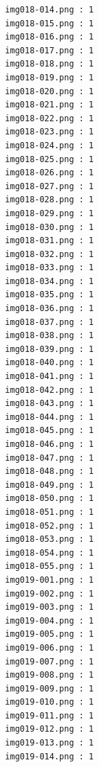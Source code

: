 \documentclass[12pt,a4paper]{article}
\begin{document}
\begin{lstlisting}
                     img018-014.png : 1
                     img018-015.png : 1
                     img018-016.png : 1
                     img018-017.png : 1
                     img018-018.png : 1
                     img018-019.png : 1
                     img018-020.png : 1
                     img018-021.png : 1
                     img018-022.png : 1
                     img018-023.png : 1
                     img018-024.png : 1
                     img018-025.png : 1
                     img018-026.png : 1
                     img018-027.png : 1
                     img018-028.png : 1
                     img018-029.png : 1
                     img018-030.png : 1
                     img018-031.png : 1
                     img018-032.png : 1
                     img018-033.png : 1
                     img018-034.png : 1
                     img018-035.png : 1
                     img018-036.png : 1
                     img018-037.png : 1
                     img018-038.png : 1
                     img018-039.png : 1
                     img018-040.png : 1
                     img018-041.png : 1
                     img018-042.png : 1
                     img018-043.png : 1
                     img018-044.png : 1
                     img018-045.png : 1
                     img018-046.png : 1
                     img018-047.png : 1
                     img018-048.png : 1
                     img018-049.png : 1
                     img018-050.png : 1
                     img018-051.png : 1
                     img018-052.png : 1
                     img018-053.png : 1
                     img018-054.png : 1
                     img018-055.png : 1
                     img019-001.png : 1
                     img019-002.png : 1
                     img019-003.png : 1
                     img019-004.png : 1
                     img019-005.png : 1
                     img019-006.png : 1
                     img019-007.png : 1
                     img019-008.png : 1
                     img019-009.png : 1
                     img019-010.png : 1
                     img019-011.png : 1
                     img019-012.png : 1
                     img019-013.png : 1
                     img019-014.png : 1




\end{lstlisting}
\end{document}
